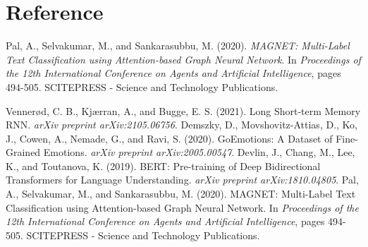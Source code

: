 \documentclass{article}
\begin{document}
\section{Reference}
\begin{thebibliography}{99}
Pal, A., Selvakumar, M., and Sankarasubbu, M. (2020).
\textit{MAGNET: Multi-Label Text Classification using Attention-based Graph Neural Network}.
In \textit{Proceedings of the 12th International Conference on Agents and Artificial Intelligence}, pages 494-505. SCITEPRESS - Science and Technology Publications.

Vennerød, C. B., Kjærran, A., and Bugge, E. S. (2021). Long Short-term Memory RNN. \emph{arXiv preprint arXiv:2105.06756}.
Demszky, D., Movshovitz-Attias, D., Ko, J., Cowen, A., Nemade, G., and Ravi, S. (2020). GoEmotions: A Dataset of Fine-Grained Emotions. \emph{arXiv preprint arXiv:2005.00547}.
Devlin, J., Chang, M., Lee, K., and Toutanova, K. (2019). BERT: Pre-training of Deep Bidirectional Transformers for Language Understanding. \emph{arXiv preprint arXiv:1810.04805}.
Pal, A., Selvakumar, M., and Sankarasubbu, M. (2020). MAGNET: Multi-Label Text Classification using Attention-based Graph Neural Network. In \emph{Proceedings of the 12th International Conference on Agents and Artificial Intelligence}, pages 494-505. SCITEPRESS - Science and Technology Publications.
\end{thebibliography}
\appendix
\end{document}
